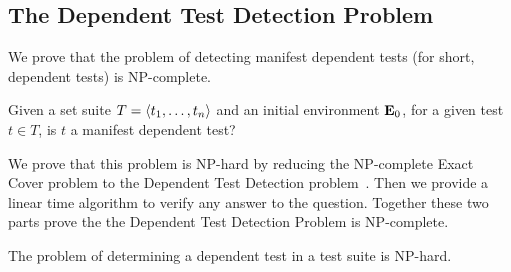 \subsection{The Dependent Test Detection Problem}

We prove that the problem of detecting manifest dependent tests (for
short, dependent tests) is NP-complete.


\begin{definition}
Given a set suite\/ $T =  \langle t_1, \dots, t_n \rangle $ and an initial environment\/
$\mathbf{E}_0$, for a given test\/ $t \in T$, is $t$ a manifest dependent test?
\end{definition}

We prove that this problem is NP-hard by reducing the NP-complete Exact Cover problem
to the Dependent Test Detection
problem~\cite{karp:NP:1972}. 
Then we provide a linear time algorithm to verify any answer to the
question.
Together these two parts prove the the Dependent Test Detection Problem is NP-complete.

\begin{theorem}
The problem of determining a dependent test in
a test suite is NP-hard.
\end{theorem}

